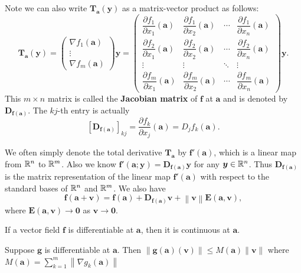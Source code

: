     \begin{remarkenv}
        Note we can also write $\bm T_{\bm a}(\bm y)$ as a matrix-vector product as follows:
        $$ \bm T_{\bm a}(\bm y) = \begin{pmatrix}
            \nabla f_1(\bm a) \\ \vdots \\ \nabla f_m(\bm a)
        \end{pmatrix} \bm y = \begin{pmatrix}
            \dfrac{\partial f_1}{\partial x_1}(\bm a) & \dfrac{\partial f_1}{\partial x_2}(\bm a) & \cdots & \dfrac{\partial f_1}{\partial x_n}(\bm a) \\[8pt]
            \dfrac{\partial f_2}{\partial x_1}(\bm a) & \dfrac{\partial f_2}{\partial x_2}(\bm a) & \cdots & \dfrac{\partial f_2}{\partial x_n}(\bm a) \\[8pt]
                \vdots & \vdots & \ddots & \vdots \\[8pt]
            \dfrac{\partial f_m}{\partial x_1}(\bm a) & \dfrac{\partial f_m}{\partial x_2}(\bm a) & \cdots & \dfrac{\partial f_m}{\partial x_n}(\bm a)
        \end{pmatrix} \bm y. $$
        This $m\times n$ matrix is called the \textbf{Jacobian matrix} of $\bm f$ at $\bm a$ and is denoted by $\mathbf{D}_{\bm f(\bm a)}$.
        The $kj$-th entry is actually $$\left[ \mathbf{D}_{\bm f(\bm a)} \right]_{kj} = \dfrac{\partial f_k}{\partial x_j}(\bm a) = D_j f_k(\bm a).$$

        We often simply denote the total derivative $\bm T_{\bm a}$ by $\bm f'(\bm a)$, which is a linear map from $\mathbb{R}^n$ to $\mathbb{R}^m$. Also we know $\bm f'(\bm a; \bm y) = \mathbf D_{\bm f(\bm a)} \bm y$ for any $\bm y\in \mathbb{R}^n$. Thus $\mathbf D_{\bm f(\bm a)}$ is the matrix representation of the linear map $\bm f'(\bm a)$ with respect to the standard bases of $\mathbb{R}^n$ and $\mathbb{R}^m$. We also have
        $$ \bm f(\bm a + \bm v) = \bm f(\bm a) + \mathbf D_{\bm f(\bm a)} \bm v + \left\|\bm v\right\| \bm E(\bm a, \bm v),$$
        where $\bm E(\bm a, \bm v) \to \bm 0$ as $\bm v \to \bm 0$.
    \end{remarkenv}
    \begin{theoremenv}
        If a vector field $\bm f$ is differentiable at $\bm a$, then it is continuous at $\bm a$.
    \end{theoremenv}
    \begin{lemmaenv}
        Suppose $\bm g$ is differentiable at $\bm a$. Then $\| \bm g(\bm a) (\bm v) \| \le M(\bm a) \| \bm v\|$ where $M(\bm a)=\displaystyle \sum_{k=1}^m \left\|\nabla g_k(\bm a)\right\|$
    \end{lemmaenv}
